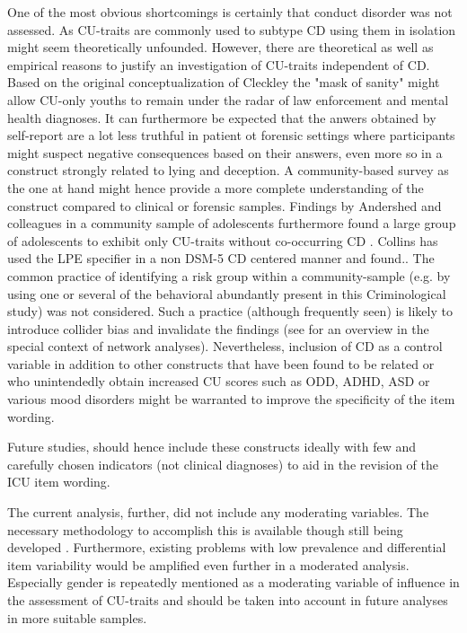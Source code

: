  One of the most obvious shortcomings is certainly that conduct disorder was not assessed.
 As CU-traits are commonly used to subtype CD using them in isolation might seem theoretically unfounded.
 However, there are theoretical as well as empirical reasons to justify an investigation of CU-traits independent of CD.
 Based on the original conceptualization of Cleckley the "mask of sanity" might allow CU-only youths to remain under the radar of law enforcement
 and mental health diagnoses. 
 It can furthermore be expected that the anwers obtained by self-report are a lot less truthful in patient ot forensic settings where participants might suspect negative consequences based on their answers,
 even more so in a construct strongly related to lying and deception.
 A community-based survey as the one at hand might hence provide a more complete understanding of the construct
 compared to clinical or forensic samples. Findings by Andershed and colleagues in a community sample of adolescents furthermore found 
 a large group of adolescents to exhibit only CU-traits without co-occurring CD \parencite{andershed_callous-unemotional_2018}.
 Collins \parencite{colins_clinical_2016} has used the LPE specifier in a non DSM-5 CD centered manner and found..
The common practice of identifying a risk group within a community-sample (e.g. by using one or several of the behavioral abundantly present in this Criminological study)
was not considered. Such a practice (although frequently seen) is likely to introduce collider bias and invalidate the findings (see  for an overview in the special context of network analyses).
Nevertheless, inclusion of CD as a control variable in addition to other constructs that have been found to be related or who 
unintendedly obtain increased CU scores such as ODD, ADHD, ASD or various mood disorders might be warranted to improve the specificity of the item wording. 

Future studies, should hence include these constructs ideally with few and carefully chosen indicators (not clinical diagnoses) to aid in the revision of the ICU item wording.

The current analysis, further,  did not include any moderating variables. 
The necessary methodology to accomplish this is available though still being developed \parencite{haslbeck_moderated_2019}.
Furthermore, existing problems with low prevalence and differential item variability would be amplified even further in a moderated analysis.  
Especially gender is repeatedly mentioned as a moderating variable of influence in the assessment of CU-traits \parencite{cardinale_reliability_2017} and should be taken into account in future analyses in more suitable samples.
     

